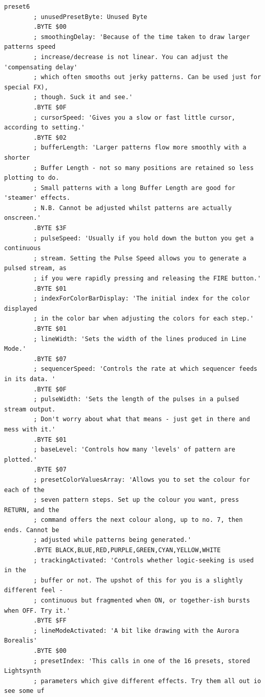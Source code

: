 \begin{lstlisting}[basicstyle=\tiny,caption=Source code for Preset 6.]
preset6
        ; unusedPresetByte: Unused Byte
        .BYTE $00
        ; smoothingDelay: 'Because of the time taken to draw larger patterns speed
        ; increase/decrease is not linear. You can adjust the 'compensating delay'
        ; which often smooths out jerky patterns. Can be used just for special FX),
        ; though. Suck it and see.'
        .BYTE $0F
        ; cursorSpeed: 'Gives you a slow or fast little cursor, according to setting.'
        .BYTE $02
        ; bufferLength: 'Larger patterns flow more smoothly with a shorter
        ; Buffer Length - not so many positions are retained so less plotting to do.
        ; Small patterns with a long Buffer Length are good for 'steamer' effects.
        ; N.B. Cannot be adjusted whilst patterns are actually onscreen.'
        .BYTE $3F
        ; pulseSpeed: 'Usually if you hold down the button you get a continuous
        ; stream. Setting the Pulse Speed allows you to generate a pulsed stream, as
        ; if you were rapidly pressing and releasing the FIRE button.'
        .BYTE $01
        ; indexForColorBarDisplay: 'The initial index for the color displayed
        ; in the color bar when adjusting the colors for each step.'
        .BYTE $01
        ; lineWidth: 'Sets the width of the lines produced in Line Mode.'
        .BYTE $07
        ; sequencerSpeed: 'Controls the rate at which sequencer feeds in its data. '
        .BYTE $0F
        ; pulseWidth: 'Sets the length of the pulses in a pulsed stream output.
        ; Don't worry about what that means - just get in there and mess with it.'
        .BYTE $01
        ; baseLevel: 'Controls how many 'levels' of pattern are plotted.'
        .BYTE $07
        ; presetColorValuesArray: 'Allows you to set the colour for each of the
        ; seven pattern steps. Set up the colour you want, press RETURN, and the
        ; command offers the next colour along, up to no. 7, then ends. Cannot be
        ; adjusted while patterns being generated.'
        .BYTE BLACK,BLUE,RED,PURPLE,GREEN,CYAN,YELLOW,WHITE
        ; trackingActivated: 'Controls whether logic-seeking is used in the
        ; buffer or not. The upshot of this for you is a slightly different feel -
        ; continuous but fragmented when ON, or together-ish bursts when OFF. Try it.'
        .BYTE $FF
        ; lineModeActivated: 'A bit like drawing with the Aurora Borealis'
        .BYTE $00
        ; presetIndex: 'This calls in one of the 16 presets, stored Lightsynth
        ; parameters which give different effects. Try them all out io see some uf

\end{lstlisting}
